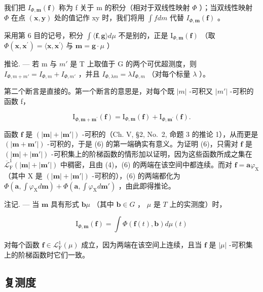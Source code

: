 我们把 \(I_{\Phi,\mathbf{m}}(\mathbf{f})\) 称为 f 关于 m 的积分（相对于双线性映射 \(\Phi\) ）；当双线性映射 \(\Phi\) 在点 \((\mathbf{x},\mathbf{y})\) 处的值记作 xy 时，我们将用 \(\int f dm\) 代替 \(I_{\Phi,\mathbf{m}}(\mathbf{f})\) 。

采用第 6 目的记号，积分 \(\int \langle \mathbf{f},\mathbf{g}\rangle d\mu\) 不是别的，正是 \(\mathrm{I}_{\Phi ,\mathbf{m}}(\mathbf{f})\) （取 \(\Phi (\mathbf{x},\mathbf{x}^{\prime}) = \langle \mathbf{x},\mathbf{x}^{\prime}\rangle\) 与 \(\mathbf{m} = \mathbf{g}\cdot \mu\) ）

推论. --- 若 m 与 \(m'\) 是 T 上取值于 G 的两个可优超测度，则 \(I_{\Phi,m+m'} = I_{\Phi,m} + I_{\Phi,m'}\) ，并且 \(I_{\Phi,\lambda m} = \lambda I_{\Phi,m}\) （对每个标量 \(\lambda\) ）。

第二个断言是直接的。第一个断言的意思是，对每个既 \(|m|\) -可积又 \(|m'|\) -可积的函数 f，

\[
\mathrm{I} _ {\Phi , \mathbf {m} + \mathbf {m} ^ {\prime}} (\mathbf {f}) = \mathrm{I} _ {\Phi , \mathbf {m}} (\mathbf {f}) + \mathrm{I} _ {\Phi , \mathbf {m} ^ {\prime}} (\mathbf {f}).\tag{6}
\]

函数 \(\mathbf{f}\) 是 \((|\mathbf{m}| + |\mathbf{m}'|)\) -可积的（Ch. V, §2, No.~2, 命题 3 的推论 1），从而更是 \((|\mathbf{m} + \mathbf{m}'|)\) -可积的，于是 (6) 的第一端确实有意义。为证明 (6)，只需对 \(\mathbf{f}\) 是 \((|\mathbf{m}| + |\mathbf{m}'|)\) -可积集上的阶梯函数的情形加以证明，因为这些函数所成之集在 \(\overline{\mathcal{L}}_{\mathrm{F}}^{1}(|\mathbf{m}| + |\mathbf{m}'|)\) 中稠密，且由 (4)，(6) 的两端在该空间中都连续。而对 \(\mathbf{f} = \mathbf{a}\varphi_{\mathrm{X}}\) （其中 \(\mathrm{X}\) 是 \((|\mathbf{m}| + |\mathbf{m}'|)\) -可积的），(6) 的两端都化为 \(\Phi(\mathbf{a}, \int \varphi_{\mathrm{X}} d\mathbf{m}) + \Phi(\mathbf{a}, \int \varphi_{\mathrm{X}} d\mathbf{m}')\) ，由此即得推论。

注记. --- 当 \(\mathbf{m}\) 具有形式 \(\mathbf{b}\mu\) （其中 \(\mathbf{b} \in G\) ， \(\mu\) 是 \(T\) 上的实测度）时，

\[
\mathrm{I} _ {\Phi , \mathbf {m}} (\mathbf {f}) = \int \Phi (\mathbf {f} (t), \mathbf {b}) d \mu (t)
\]

对每个函数 \(\mathbf{f} \in \mathcal{L}_{\mathrm{F}}^{1}(\mu)\) 成立，因为两端在该空间上连续，且当 \(\mathbf{f}\) 是 \(|\mu|\) -可积集上的阶梯函数时它们一致。

\subsection{复测度}

